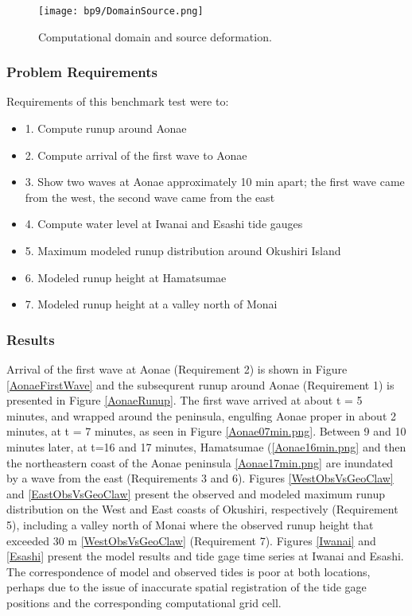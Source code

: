 \begin{figure}[ht]
\hfil\texttt{[image: bp9/DomainSource.png]}\hfil
\caption{\label{DomainSource}
Computational domain and source deformation.
  }
\end{figure} 

\subsubsection{Problem Requirements}
  Requirements of this benchmark test were to:
\begin{itemize}
\item 1. Compute runup around Aonae
\item 2. Compute arrival of the first wave to Aonae
\item 3. Show two waves at Aonae approximately 10 min apart; the first wave came from the west, the second wave came from the east
\item 4. Compute water level at Iwanai and Esashi tide gauges
\item 5. Maximum modeled runup distribution around Okushiri Island
\item 6. Modeled runup height at Hamatsumae
\item 7. Modeled runup height at a valley north of Monai
\end{itemize}

\subsubsection{Results}

  Arrival of the first wave at Aonae (Requirement 2) is shown in Figure \ref{AonaeFirstWave} and the subsequrent runup around Aonae (Requirement 1) is presented in Figure \ref{AonaeRunup}.  The first wave arrived at about t = 5 minutes, and wrapped around the peninsula, engulfing Aonae proper in about 2 minutes, at t = 7 minutes, as seen in Figure \ref{Aonae07min.png}.  Between 9 and 10 minutes later, at t=16 and 17 minutes, Hamatsumae (\ref{Aonae16min.png} and then the northeastern coast of the Aonae peninsula \ref{Aonae17min.png} are inundated by a wave from the east (Requirements 3 and 6).  Figures \ref{WestObsVsGeoClaw} and \ref{EastObsVsGeoClaw} present the observed and modeled maximum runup distribution on the West and East coasts of Okushiri, respectively (Requirement 5), including a valley north of Monai where the observed runup height that exceeded 30 m \ref{WestObsVsGeoClaw} (Requirement 7).  Figures \ref{Iwanai} and \ref{Esashi} present the model results and tide gage time series at Iwanai and Esashi.  The correspondence of model and observed tides is poor at both locations, perhaps due to the issue of inaccurate spatial registration of the tide gage positions and the corresponding computational grid cell.  

